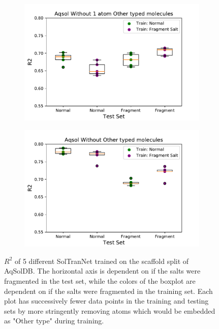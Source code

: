 \documentclass[journal=jcisd8,manuscript=article]{achemso}
\begin{document}
\begin{figure}[tb]
    \begin{subfigure}[t]{0.48\textwidth}
        \centering
        \includegraphics[width=\linewidth]{figures/others2plus_saltfragfirst_R2s_boxplots.pdf}
    \end{subfigure}%
    \hfill
    \begin{subfigure}[t]{0.48\textwidth}
        \centering
        \includegraphics[width=\linewidth]{figures/noothers_saltfragfirst_R2s_boxplots.pdf}
    \end{subfigure}
    \caption{$R^2$ of 5 different SolTranNet trained on the scaffold split of AqSolDB. The horizontal axis is dependent on if the salts were fragmented in the test set, while the colors of the boxplot are dependent on if the salts were fragmented in the training set. Each plot has successively fewer data points in the training and testing sets by more stringently removing atoms which would be embedded as "Other type" during training.}
    \label{fig:saltfragr2}
\end{figure}
\end{document}
